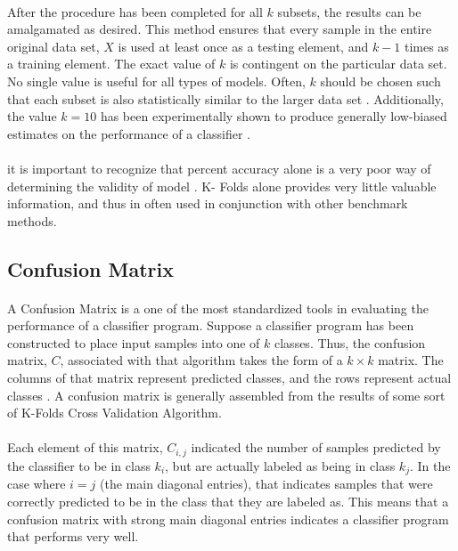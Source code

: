 \documentclass[12pt,letterpaper]{article}
\begin{document}
\paragraph*{}After the procedure has been completed for all $k$ subsets, the results can be amalgamated as desired. This method ensures that every sample in the entire original data set, $X$ is used at least once as a testing element, and $k-1$ times as a training element. The exact value of $k$ is contingent on the particular data set. No single value is useful for all types of models. Often, $k$ should be chosen such that each subset is also statistically similar to the larger data set \cite{Geron}. Additionally, the value $k = 10$ has been experimentally shown to produce generally low-biased estimates on the performance of a classifier \cite{Brownlee}.
\paragraph*{}it is important to recognize that percent accuracy alone is a very poor way of determining the validity of model \cite{Geron}. K- Folds alone provides very little valuable information, and thus in often used in conjunction with other benchmark methods.


\subsection{Confusion Matrix}
\paragraph*{}A Confusion Matrix is a one of the most standardized tools in evaluating the performance of a classifier program. Suppose a classifier program has been constructed to place input samples into one of $k$ classes. Thus, the confusion matrix, $C$, associated with that algorithm takes the form of a $k \times k$ matrix. The columns of that matrix represent predicted classes, and the rows represent actual classes \cite{Geron}. A confusion matrix is generally assembled from the results of some sort of K-Folds Cross Validation Algorithm. 
\paragraph*{}Each element of this matrix, $C_{i,j}$ indicated the number of samples predicted by the classifier to be in class $k_i$, but are actually labeled as being in class $k_j$. In the case where $i = j$ (the main diagonal entries), that indicates samples that were correctly predicted to be in the class that they are labeled as. This means that a confusion matrix with strong main diagonal entries indicates a classifier program that performs very well. 
\end{document}
